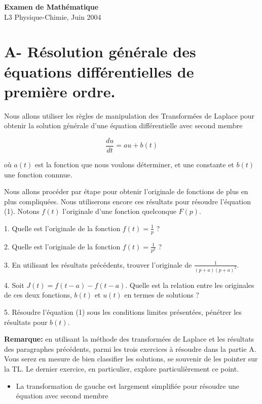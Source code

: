 \documentclass{article}
\begin{document}
\begin{center}
\textbf{Examen de Mathématique}\\
L3 Physique-Chimie, Juin 2004
\end{center}

\section*{A- Résolution générale des équations différentielles de première ordre.}

Nous allons utiliser les règles de manipulation des Transformées de Laplace pour obtenir la solution générale d'une équation différentielle avec second membre

\begin{equation}
\frac{du}{dt} = au + b(t)
\end{equation}

où \(a(t)\) est la fonction que nous voulons déterminer, et une constante et \(b(t)\) une fonction connnue.

Nous allons procéder par étape pour obtenir l'originale de fonctions de plus en plus compliquées. Nous utiliserons encore ces résultats pour résoudre l'équation (1). Notons \(f(t)\) l'originale d'une fonction quelconque \(F(p)\).

1. Quelle est l'originale de la fonction \(f(t) = \frac{1}{p}\) ?

2. Quelle est l'originale de la fonction \(f(t) = \frac{1}{p^2}\) ?

3. En utilisant les résultats précédents, trouver l'originale de \(\frac{1}{(p+a)(p+a)^2}\).

4. Soit \(J(t) = f(t-a) - f(t-a)\). Quelle est la relation entre les originales de ces deux fonctions, \(b(t)\) et \(u(t)\) en termes de solutions ?

5. Résoudre l'équation (1) sous les conditions limites présentées, pénétrer les résultats pour \(b(t)\).

\textbf{Remarque:} en utilisant la méthode des transformées de Laplace et les résultats des paragraphes précédents, parmi les trois exercices à résoudre dans la partie A. Vous serez en mesure de bien classifier les solutions, se souvenir de les pointer sur la TL. Le dernier exercice, en particulier, explore particulièrement ce point.

\begin{itemize}
    \item La transformation de gauche est largement simplifiée pour résoudre une équation avec second membre
\end{itemize}
\end{document}
